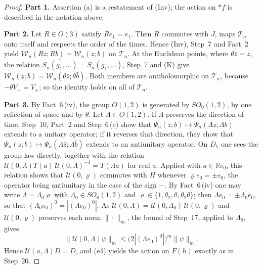 \documentclass[11pt,letterpaper,reqno]{amsart}
\theoremstyle{definition}
\begin{document}
\begin{proof}
\textbf{Part 1.}
Assertion (a) is a restatement of (Inv); the action on $\ast f$ is described in the notation above.

\textbf{Part 2.}
Let $R\in O(3)$ satisfy $Re_1=e_1$.
Then $R$ commutes with $J$, maps $\mathcal T_n$ onto itself and respects the order of the times.
Hence (Inv), Step~7 and Fact~2 yield $\mathcal W_n(Rz;Rb)=\mathcal W_n(z;b)$ on $\mathcal T_n$.
At the Euclidean points, where $\theta\bar z=z$, the relation $\overline{S_n(g_1,\dots)}=S_n(\bar g_1,\dots)$, Step~7 and (K) give $\overline{\mathcal W_n(z;b)}=\allowbreak \mathcal W_n(\theta\bar z;\theta\bar b)$.
Both members are antiholomorphic on $\mathcal T_n$, because $-\theta V_+=V_+$; so the identity holds on all of $\mathcal T_n$.

\textbf{Part 3.}
By Fact~6\,(iv), the group $O(1,2)$ is generated by $SO_0(1,2)$, by one reflection of space and by $\theta$.
Let $\Lambda\in O(1,2)$.
If $\Lambda$ preserves the direction of time, Step~10, Part~2 and Step~6\,(c) show that $\Psi_n(z;b)\mapsto\Psi_n(\Lambda z;\Lambda b)$ extends to a unitary operator; if it reverses that direction, they show that $\Psi_n(z;b)\mapsto\Psi_n(\Lambda\bar z;\Lambda\bar b)$ extends to an antiunitary operator.
On $D_1$ one sees the group law directly, together with the relation $\mathcal U(0,\allowbreak \Lambda)T(a)\,\allowbreak \mathcal U(0,\allowbreak \Lambda)^{-1}=\allowbreak T(\Lambda a)$ for real $a$.
Applied with $a\in\mathbb Re_0$, this relation shows that $\mathcal U(0,\varrho)$ commutes with $H$ whenever $\varrho e_0=\pm e_0$, the operator being antiunitary in the case of the sign $-$.
By Fact~6\,(iv) one may write $\Lambda=\Lambda_0\varrho$ with $\Lambda_0\in SO_0(1,2)$ and $\varrho\in\{1,\theta_2,\theta,\theta_2\theta\}$; then $\Lambda e_0=\pm\Lambda_0e_0$, so that $(\Lambda_0e_0)^0=|(\Lambda e_0)^0|$.
As $\mathcal U(0,\allowbreak \Lambda)=\allowbreak \mathcal U(0,\allowbreak \Lambda_0)\,\allowbreak \mathcal U(0,\allowbreak \varrho)$ and $\mathcal U(0,\varrho)$ preserves each norm $\|\cdot\|_m$, the bound of Step~17, applied to $\Lambda_0$, gives
\begin{equation*}
\|\mathcal U(0,\Lambda)\psi\|_m\le\bigl(2|(\Lambda e_0)^0|\bigr)^m\|\psi\|_m .
\end{equation*}
Hence $\mathcal U(a,\Lambda)D=D$, and (e4) yields the action on $F(h)$ exactly as in Step~20.


\end{proof}
\end{document}
